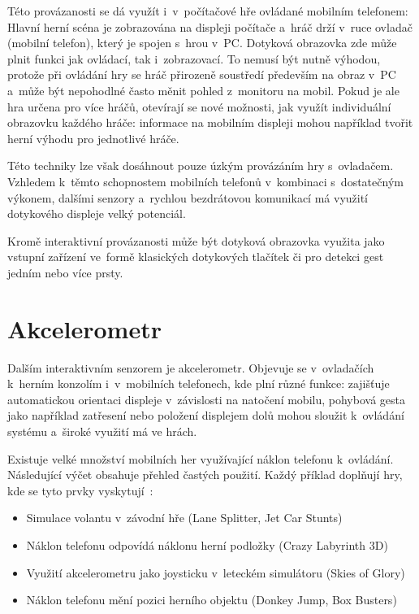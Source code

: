 \documentclass[thesis=B,czech,hidelinks]{FITthesis}[2012/06/26] %
\begin{document}
Této provázanosti se dá využít i~v~počítačové hře ovládané mobilním telefonem: Hlavní herní scéna je zobrazována na displeji počítače a~hráč drží v~ruce ovladač (mobilní telefon), který je spojen s~hrou v~PC. Dotyková obrazovka zde může plnit funkci jak ovládací, tak i~zobrazovací. To nemusí být nutně výhodou, protože při ovládání hry se hráč přirozeně soustředí především na obraz v~PC a~může být nepohodlné často měnit pohled z~monitoru na mobil. Pokud je ale hra určena pro více hráčů, otevírají se nové možnosti, jak využít individuální obrazovku každého hráče: informace na mobilním displeji mohou například tvořit herní výhodu pro jednotlivé hráče.

Této techniky lze však dosáhnout pouze úzkým provázáním hry s~ovladačem. Vzhledem k~těmto schopnostem mobilních telefonů v~kombinaci s~dostatečným výkonem, dalšími senzory a~rychlou bezdrátovou komunikací má využití dotykového displeje velký potenciál.

Kromě interaktivní provázanosti může být dotyková obrazovka využita jako vstupní zařízení ve~formě klasických dotykových tlačítek či pro detekci gest jedním nebo více prsty.

\section{Akcelerometr}
\label{section:accelerometer}

Dalším interaktivním senzorem je akcelerometr. Objevuje se v~ovladačích k~herním konzolím i~v~mobilních telefonech, kde plní různé funkce: zajišťuje automatickou orientaci displeje v~závislosti na natočení mobilu, pohybová gesta jako například zatřesení nebo položení displejem dolů mohou sloužit k~ovládání systému a~široké využití má ve hrách.

Existuje velké množství mobilních her využívající náklon telefonu k~ovládání. Následující výčet obsahuje přehled častých použití. Každý příklad doplňují hry, kde se tyto prvky vyskytují~\cite{accelerometergames}:

\begin{itemize}
	\item Simulace volantu v~závodní hře (Lane Splitter, Jet Car Stunts)
	\item Náklon telefonu odpovídá náklonu herní podložky (Crazy Labyrinth 3D)
	\item Využití akcelerometru jako joysticku v~leteckém simulátoru (Skies of Glory)
	\item Náklon telefonu mění pozici herního objektu (Donkey Jump, Box Busters)
\end{itemize}
\end{document}
